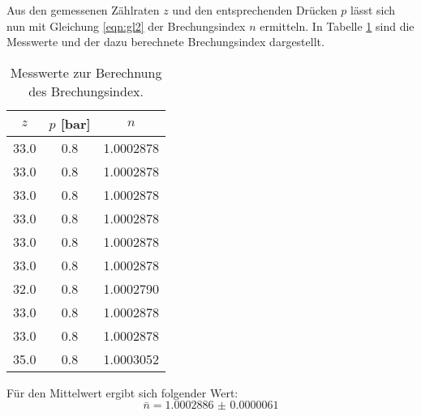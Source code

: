 Aus den gemessenen Zählraten $z$ und den entsprechenden Drücken $p$ lässt sich nun mit Gleichung \eqref{eqn:gl2} der Brechungsindex $n$ ermitteln.
In Tabelle \ref{tab:n} sind die Messwerte und der dazu berechnete Brechungsindex dargestellt.
\begin{table}
  \centering
  \caption{Messwerte zur Berechnung des Brechungsindex.}
  \label{tab:n}
  \begin{tabular}{c c c}
    \toprule
    $z$ & $p$ [\si{\bar}] & $n$ \\
    \midrule
    33.0 & 0.8 & 1.0002878 \\
    33.0 & 0.8 & 1.0002878 \\
    33.0 & 0.8 & 1.0002878 \\
    33.0 & 0.8 & 1.0002878 \\
    33.0 & 0.8 & 1.0002878 \\
    33.0 & 0.8 & 1.0002878 \\
    32.0 & 0.8 & 1.0002790 \\
    33.0 & 0.8 & 1.0002878 \\
    33.0 & 0.8 & 1.0002878 \\
    35.0 & 0.8 & 1.0003052 \\
    \bottomrule
  \end{tabular}
\end{table}
\FloatBarrier
Für den Mittelwert ergibt sich folgender Wert:
\begin{equation*}
  \bar n = \num{1.0002886(61)}
\end{equation*}
